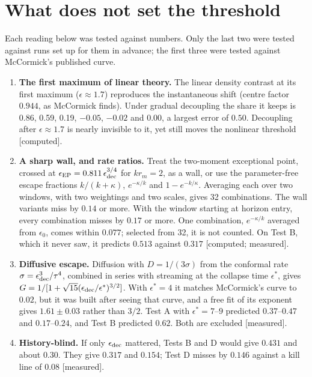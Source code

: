 \documentclass[11pt]{article}
\newcommand{\grade}[1]{\textsf{\small[#1]}}
\begin{document}
\section{What does not set the threshold}\label{sec:not}

Each reading below was tested against numbers. Only the last two were tested against runs set up for them in advance; the first three were tested against McCormick's published curve.

\begin{enumerate}
\item \textbf{The first maximum of linear theory.} The linear density contrast at its first maximum ($\epsilon\approx1.7$) reproduces the instantaneous shift (centre factor $0.944$, as McCormick finds). Under gradual decoupling the share it keeps is 0.86, 0.59, 0.19, $-0.05$, $-0.02$ and 0.00, a largest error of $0.50$. Decoupling after $\epsilon\approx1.7$ is nearly invisible to it, yet still moves the nonlinear threshold \grade{computed}.
\item \textbf{A sharp wall, and rate ratios.} Treat the two-moment exceptional point, crossed at $\epsilon_{\rm EP}=0.811\,\epsilon_{\rm dec}^{3/4}$ for $kr_m=2$, as a wall, or use the parameter-free escape fractions $k/(k+\kappa)$, $e^{-\kappa/k}$ and $1-e^{-k/\kappa}$. Averaging each over two windows, with two weightings and two scales, gives 32 combinations. The wall variants miss by $0.14$ or more. With the window starting at horizon entry, every combination misses by $0.17$ or more. One combination, $e^{-\kappa/k}$ averaged from $\epsilon_0$, comes within $0.077$; selected from 32, it is not counted. On Test B, which it never saw, it predicts $0.513$ against $0.317$ \grade{computed; measured}.
\item \textbf{Diffusive escape.} Diffusion with $D=1/(3\sigma)$ from the conformal rate $\sigma=\epsilon_{\rm dec}^3/\tau^4$, combined in series with streaming at the collapse time $\epsilon^\ast$, gives $G=1/[1+\sqrt{15}(\epsilon_{\rm dec}/\epsilon^\ast)^{3/2}]$. With $\epsilon^\ast=4$ it matches McCormick's curve to $0.02$, but it was built after seeing that curve, and a free fit of its exponent gives $1.61\pm0.03$ rather than $3/2$. Test A with $\epsilon^\ast=7$--$9$ predicted $0.37$--$0.47$ and $0.17$--$0.24$, and Test B predicted $0.62$. Both are excluded \grade{measured}.
\item \textbf{History-blind.} If only $\epsilon_{\rm dec}$ mattered, Tests B and D would give $0.431$ and about $0.30$. They give $0.317$ and $0.154$; Test D misses by $0.146$ against a kill line of $0.08$ \grade{measured}.
\end{enumerate}
\end{document}
